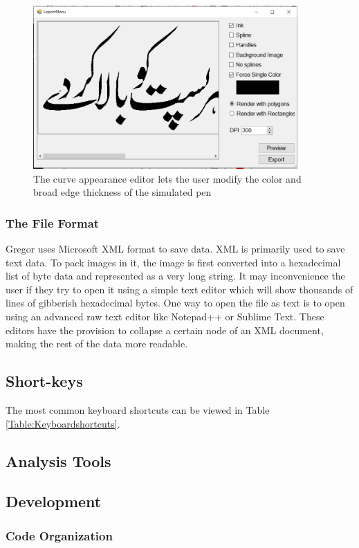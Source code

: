 {{        \begin{figure}
          \centering
          \includegraphics[width=0.9\textwidth]{../Images/ExportMenu.PNG}
          \caption{The curve appearance editor lets the user modify the color and broad edge thickness of the simulated pen} \label{Fig:ExportMenu}
        \end{figure}
    }
    \subsubsection{The File Format}
    {
        Gregor uses Microsoft XML format to save data. XML is primarily used to save text data. To pack images in it, the image is first converted into a hexadecimal list of byte data and represented as a very long string. It may inconvenience the user if they try to open it using a simple text editor which will show thousands of lines of gibberish hexadecimal bytes. One way to open the file as text is to open using an advanced raw text editor like Notepad++ or Sublime Text. These editors have the provision to collapse a certain node of an XML document, making the rest of the data more readable.
    }
}
\subsection{Short-keys}
{
    The most common keyboard shortcuts can be viewed in Table \ref{Table:Keyboardshortcuts}.
}
\subsection{Analysis Tools}
{
}
\subsection{Development}
\subsubsection{Code Organization}

